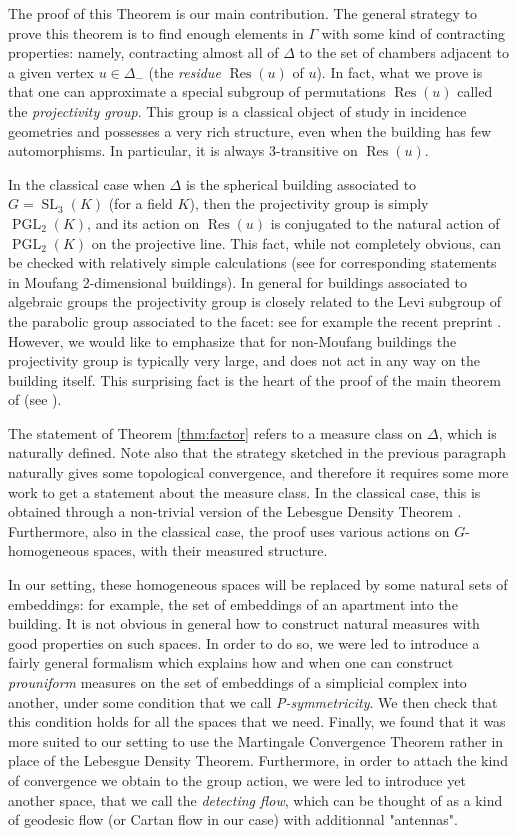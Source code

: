 \documentclass[a4paper, 11pt]{article}
\theoremstyle{plain}
\theoremstyle{definition}
\theoremstyle{remark}
\DeclareMathOperator{\Res}{Res}
\DeclareMathOperator{\SL}{SL}
\DeclareMathOperator{\PGL}{PGL}
\begin{document}
The proof of this Theorem is our main contribution. The general strategy to prove this theorem is to find enough elements in $\Gamma$ with some kind of contracting properties: namely, contracting almost all of $\Delta$ to the set of chambers adjacent to a given vertex $u\in\Delta_-$ (the \emph{residue} $\Res(u)$ of $u$). In fact, what we prove is that one can approximate a special subgroup of permutations $\Res(u)$ called the \emph{projectivity group}. This group is a classical object of study in incidence geometries and possesses a very rich structure, even when the building has few automorphisms. In particular, it is always 3-transitive on $\Res(u)$. 

In the classical case when $\Delta$ is the spherical building associated to $G=\SL_3(K)$ (for a field $K$), then the projectivity group is simply $\PGL_2(K)$, and its action on $\Res(u)$ is conjugated to the natural action of $\PGL_2(K)$ on the projective line. This fact, while not completely obvious, can be checked with relatively simple calculations (see \cite{Knarr} for corresponding statements in Moufang 2-dimensional buildings). In general for buildings associated to algebraic groups the projectivity group is closely related to the Levi subgroup of the parabolic group associated to the facet: see for example the recent preprint \cite{Busch}. However, we would like to emphasize that for non-Moufang buildings the projectivity group is typically very large, and does not act in any way on the building itself. This surprising fact is the heart of the proof of the main theorem of \cite{BCL} (see \cite[Theorem 4.7]{BCL}).

The statement of Theorem \ref{thm:factor} refers to a measure class on $\Delta$, which is naturally defined. Note also that the strategy sketched in the previous paragraph naturally gives  some topological convergence, and therefore it requires some more work to get a statement about the measure class. In the classical case, this is obtained through a non-trivial version of the Lebesgue Density Theorem \cite[IV.1]{Margulis}. Furthermore, also in the classical case, the proof uses various actions on $G$-homogeneous spaces, with their measured structure.


In our setting, these homogeneous spaces will be replaced by some natural sets of embeddings: for example, the set of embeddings of an apartment into the building. It is not obvious in general how to construct natural measures with good properties on such spaces. In order to do so, we were led to introduce a fairly general formalism which explains how and when one can construct \emph{prouniform} measures on the set of embeddings of a simplicial complex into another, under some condition that we call \emph{P-symmetricity}. We then check that this condition holds for all the spaces that we need. Finally, we found that it was more suited to our setting to use the Martingale Convergence Theorem rather in place of the Lebesgue Density Theorem. Furthermore, in order to attach the kind of convergence we obtain to the group action, we were led to introduce yet another space, that we call the \emph{detecting flow}, which can be thought of as a kind of geodesic flow (or Cartan flow in our case) with additionnal "antennas".
\end{document}
